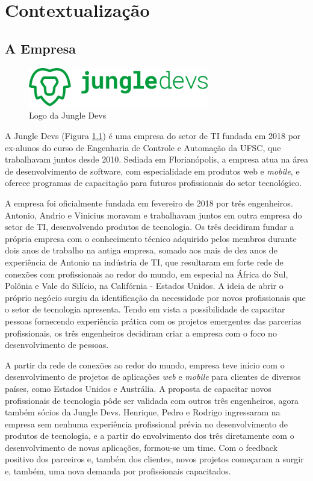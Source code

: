 \chapter{Contextualização} \label{cap:context}

\section{A Empresa}
\begin{figure}[h]
    \centering
    \includegraphics[width=0.7\textwidth]{pfc/figuras/jungledevs.png}
    \caption{Logo da Jungle Devs}
    \label{fig:jungledevs}
\end{figure}
A Jungle Devs (Figura \ref{fig:jungledevs}) é uma empresa do setor de TI fundada em 2018 por ex-alunos do curso de Engenharia de Controle e Automação da UFSC, que trabalhavam juntos desde 2010. Sediada em Florianópolis, a empresa atua na área de desenvolvimento de software, com especialidade em produtos web e \textit{mobile}, e oferece programas de capacitação para futuros profissionais do setor tecnológico.

A empresa foi oficialmente fundada em fevereiro de 2018 por três engenheiros. Antonio, Andrio e Vinicius moravam e trabalhavam juntos em outra empresa do setor de TI, desenvolvendo produtos de tecnologia. Os três decidiram fundar a própria empresa com o conhecimento técnico adquirido pelos membros durante dois anos de trabalho na antiga empresa, somado aos mais de dez anos de experiência de Antonio na indústria de TI, que resultaram em forte rede de conexões com profissionais ao redor do mundo, em especial na África do Sul, Polônia e Vale do Silício, na Califórnia - Estados Unidos. A ideia de abrir o próprio negócio surgiu da identificação da necessidade por novos profissionais que o setor de tecnologia apresenta. Tendo em vista a possibilidade de capacitar pessoas fornecendo experiência prática com os projetos emergentes das parcerias profissionais, os três engenheiros decidiram criar a empresa com o foco no desenvolvimento de pessoas.

A partir da rede de conexões ao redor do mundo, empresa teve início com o desenvolvimento de projetos de aplicações \textit{web} e \textit{mobile} para clientes de diversos países, como Estados Unidos e Austrália. A proposta de capacitar novos profissionais de tecnologia pôde ser validada com outros três engenheiros, agora também sócios da Jungle Devs. Henrique, Pedro e Rodrigo ingressaram na empresa sem nenhuma experiência profissional prévia no desenvolvimento de produtos de tecnologia, e a partir do envolvimento dos três diretamente com o desenvolvimento de novas aplicações, formou-se um time. Com o feedback positivo dos parceiros e, também dos clientes, novos projetos começaram a surgir e, também, uma nova demanda por profissionais capacitados.

